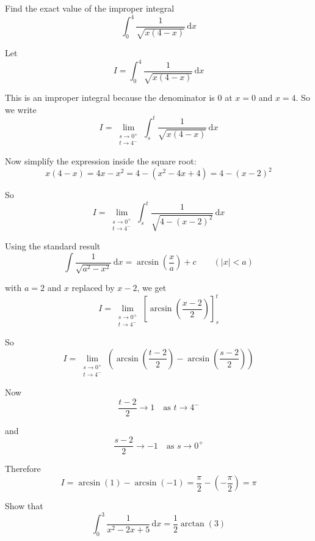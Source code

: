 \documentclass[leqno]{article}
\begin{document}
\djsFrontMatter
\begin{enumerate}[
  label=\textbf{\arabic*.},
  leftmargin=*,
  topsep=0pt,
  partopsep=0pt,
  parsep=0pt
]

\questionitem

Find the exact value of the improper integral
\[
\int_0^4 \frac{1}{\sqrt{x(4-x)}}\,\mathrm{d}x
\]

\vspace*{10pt}

\begin{djsSolution}
Let
\[
I=\int_0^4 \frac{1}{\sqrt{x(4-x)}}\,\mathrm{d}x
\]

This is an improper integral because the denominator is \(0\) at \(x=0\) and \(x=4\). So we write
\[
I=\lim_{\substack{s\to 0^+\\ t\to 4^-}}\int_s^t \frac{1}{\sqrt{x(4-x)}}\,\mathrm{d}x
\]

Now simplify the expression inside the square root:
\[
x(4-x)=4x-x^2=4-(x^2-4x+4)=4-(x-2)^2
\]

So
\[
I=\lim_{\substack{s\to 0^+\\ t\to 4^-}}\int_s^t \frac{1}{\sqrt{4-(x-2)^2}}\,\mathrm{d}x
\]

Using the standard result
\[
\int \frac{1}{\sqrt{a^2-x^2}}\,\mathrm{d}x=\arcsin\left(\frac{x}{a}\right)+c\qquad (|x|<a)
\]

with \(a=2\) and \(x\) replaced by \(x-2\), we get
\[
I=\lim_{\substack{s\to 0^+\\ t\to 4^-}}\left[\arcsin\left(\frac{x-2}{2}\right)\right]_{s}^{t}
\]

So
\[
I=\lim_{\substack{s\to 0^+\\ t\to 4^-}}\left(\arcsin\left(\frac{t-2}{2}\right)-\arcsin\left(\frac{s-2}{2}\right)\right)
\]

Now
\[
\frac{t-2}{2}\to 1 \quad \text{as } t\to 4^-
\]

and
\[
\frac{s-2}{2}\to -1 \quad \text{as } s\to 0^+
\]

Therefore
\[
I=\arcsin (1)-\arcsin (-1)=\frac{\pi}{2}-\left(-\frac{\pi}{2}\right)=\pi
\]
\end{djsSolution}


\newpage

\questionitem

Show that
\[
\int_{0}^{3} \frac{1}{x^2 - 2x + 5}\,\mathrm{d}x = \frac{1}{2}\arctan (3)
\]


\end{enumerate}
\end{document}
